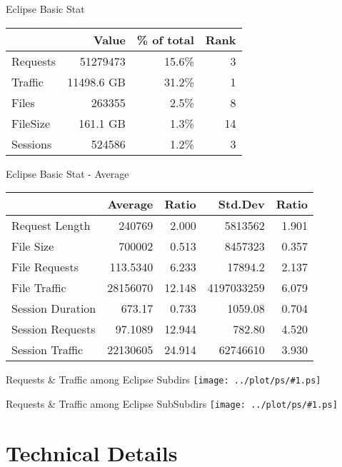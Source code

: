 \documentclass{beamer}
\newcommand\graph[1]{{\texttt{[image: ../plot/ps/\#1.ps]}}}
\begin{document}
\begin{frame}{Eclipse Basic Stat}
\begin{tabular}[t]{|l|r|r|r|}
\hline
 & Value & \% of total & Rank \\
\hline
Requests& 51279473 & 15.6\% & 3 \\
Traffic & 11498.6 GB & 31.2\% & 1 \\
Files 	& 263355 & 2.5\% & 8 \\
FileSize& 161.1 GB & 1.3\% & 14 \\
Sessions& 524586 & 1.2\% & 3 \\
\hline
\hline
\end{tabular}
\end{frame}

\begin{frame}{Eclipse Basic Stat - Average}
\begin{tabular}[t]{|l|r|r|r|r|}
\hline
 & Average & Ratio & Std.Dev & Ratio \\
\hline
Request Length	& 240769 & 2.000 & 5813562 & 1.901 \\
File Size	& 700002 & 0.513 & 8457323 & 0.357 \\
File Requests	& 113.5340 & 6.233 & 17894.2 & 2.137 \\
File Traffic	& 28156070 & 12.148 & 4197033259 & 6.079 \\
Session Duration& 673.17 & 0.733 & 1059.08 & 0.704 \\
Session Requests& 97.1089 & 12.944 & 782.80 & 4.520 \\
Session Traffic & 22130605 & 24.914 & 62746610 & 3.930 \\
\hline
\end{tabular}
\end{frame}

\begin{frame}{Requests \& Traffic among Eclipse Subdirs}
\graph{dist-subdir-eclipse}
\end{frame}

\begin{frame}{Requests \& Traffic among Eclipse SubSubdirs}
\graph{dist-subsubdir-eclipse}
\end{frame}

\section{Technical Details}
\end{document}
